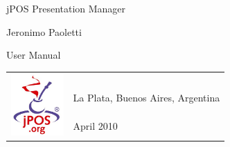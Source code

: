 \begin{titlepage}
\begin{center}

\vspace*{2cm}

\huge{jPOS Presentation Manager}

\vspace{.5cm}
\large{Jeronimo Paoletti}

\vspace{1cm}

\vspace{1cm}
\huge{User Manual}


\vspace{6cm}

\end{center}
\normalsize

\begin{table}[!h]
\begin{tabular}{ll}
\multirow{4}{*}{\includegraphics[width=20mm]{img/jpos.jpg}} & \\
&  \\
& La Plata, Buenos Aires, Argentina \\
& April 2010 \\

\end{tabular}
\end{table}

\end{titlepage}

\clearpage
